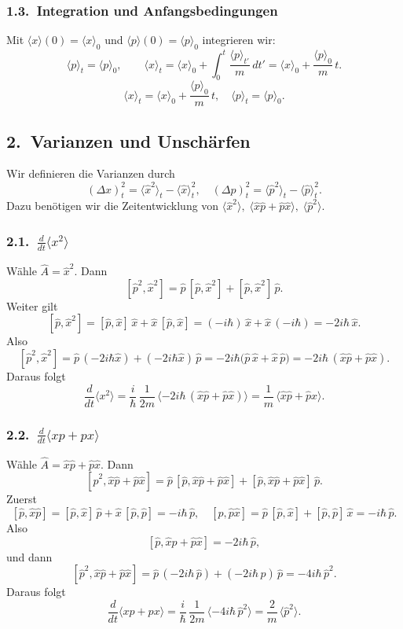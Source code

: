 \documentclass[a4paper,12pt]{article}
\begin{document}
\subsubsection*{1.3.\ Integration und Anfangsbedingungen}
Mit
\(\langle x\rangle(0)=\langle x\rangle_0\) und
\(\langle p\rangle(0)=\langle p\rangle_0\) integrieren wir:
\[
  \langle p\rangle_t = \langle p\rangle_0,
  \qquad
  \langle x\rangle_t
  = \langle x\rangle_0
    + \int_0^t \frac{\langle p\rangle_{t'}}{m}\,dt'
  = \langle x\rangle_0 + \frac{\langle p\rangle_0}{m}\,t.
\]
\[
  \boxed{
    \langle x\rangle_t
    = \langle x\rangle_0 + \frac{\langle p\rangle_0}{m}\,t,
    \quad
    \langle p\rangle_t
    = \langle p\rangle_0.
  }
\]

\subsection*{2.\ Varianzen und Unschärfen}

Wir definieren die Varianzen durch
\[
  (\Delta x)^2_t
  = \langle \hat x^2\rangle_t - \langle \hat x\rangle_t^2,
  \quad
  (\Delta p)^2_t
  = \langle \hat p^2\rangle_t - \langle \hat p\rangle_t^2.
\]
Dazu benötigen wir die Zeitentwicklung von
\(\langle \hat x^2\rangle,\;\langle \hat x\hat p+\hat p\hat x\rangle,\;\langle \hat p^2\rangle\).

\subsubsection*{2.1.\ \(\frac{d}{dt}\langle x^2\rangle\)}
Wähle \(\hat A = \hat x^2\). Dann
\[
  [\hat p^2,\hat x^2]
  = \hat p\,[\hat p,\hat x^2] + [\hat p,\hat x^2]\,\hat p.
\]
Weiter gilt
\[
  [\hat p,\hat x^2]
  = [\hat p,\hat x]\,\hat x + \hat x\,[\hat p,\hat x]
  = (-i\hbar)\,\hat x + \hat x\,(-i\hbar)
  = -2i\hbar\,\hat x.
\]
Also
\[
  [\hat p^2,\hat x^2] = \hat p\,(-2i\hbar \hat x) + (-2i\hbar \hat x)\,\hat p
  = -2i\hbar\bigl(\hat p\,\hat x + \hat x\,\hat p\bigr)
  = -2i\hbar\,(\hat x\hat p + \hat p\hat x).
\]
Daraus folgt
\[
  \frac{d}{dt}\langle x^2\rangle
  = \frac{i}{\hbar}\,\frac{1}{2m}\,
    \langle -2i\hbar \,(\hat x\hat p + \hat p\hat x)\rangle
  = \frac{1}{m}\,\langle \hat x\hat p + \hat p\hat x\rangle.
\]

\subsubsection*{2.2.\ \(\frac{d}{dt}\langle x p + p x\rangle\)}
Wähle \(\hat A = \hat x\hat p + \hat p\hat x\). Dann
\[
  [\hat p^2,\hat x\hat p + \hat p\hat x]
  = \hat p\,[\hat p,\hat x\hat p + \hat p\hat x]
    + [\hat p,\hat x\hat p + \hat p\hat x]\,\hat p.
\]
Zuerst
\[
  [\hat p,\hat x\hat p]
  = [\hat p,\hat x]\,\hat p + \hat x\,[\hat p,\hat p]
  = -i\hbar\,\hat p,
  \quad
  [\hat p,\hat p\hat x]
  = \hat p\,[\hat p,\hat x] + [\hat p,\hat p]\,\hat x
  = -i\hbar\,\hat p.
\]
Also
\[
  [\hat p,\hat x\hat p + \hat p\hat x]
  = -2i\hbar\,\hat p,
\]
und dann
\[
  [\hat p^2,\hat x\hat p + \hat p\hat x]
  = \hat p\,(-2i\hbar\,\hat p) + (-2i\hbar\,\hat p)\,\hat p
  = -4i\hbar\,\hat p^2.
\]
Daraus folgt
\[
  \frac{d}{dt}\langle x p + p x\rangle
  = \frac{i}{\hbar}\,\frac{1}{2m}\,
    \langle -4i\hbar\,\hat p^2\rangle
  = \frac{2}{m}\,\langle \hat p^2\rangle.
\]
\end{document}
